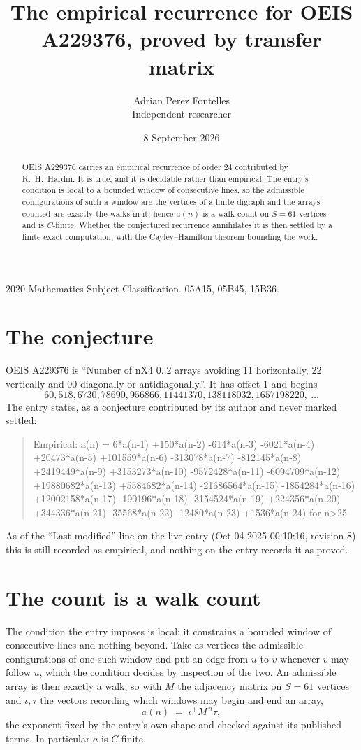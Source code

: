 \documentclass[11pt,a4paper]{article}
\title{The empirical recurrence for OEIS A229376, proved by transfer matrix}
\author{Adrian Perez Fontelles\\ \small Independent researcher}
\date{8 September 2026}
\theoremstyle{plain}
\theoremstyle{definition}
\begin{document}
\maketitle

\begin{abstract}
OEIS A229376 carries an empirical recurrence of order $24$ contributed by R.~H.~Hardin. It is
true, and it is decidable rather than empirical. The entry's condition is local to a bounded window of consecutive lines, so
the admissible configurations of such a window are the vertices of a finite digraph and the
arrays counted are exactly the walks in it; hence $a(n)$ is a walk count on $S=61$ vertices
and is $C$-finite. Whether the conjectured recurrence annihilates it is then settled by a
finite exact computation, with the Cayley--Hamilton theorem bounding the work.
\end{abstract}

\noindent\small 2020 Mathematics Subject Classification. 05A15, 05B45, 15B36.\normalsize

\section{The conjecture}

OEIS A229376 is ``Number of nX4 0..2 arrays avoiding 11 horizontally, 22 vertically and 00 diagonally or antidiagonally.''. It has offset $1$ and begins
\[
60, 518, 6730, 78690, 956866, 11441370, 138118032, 1657198220,\ \dots
\]
The entry states, as a conjecture contributed by its author and never marked settled:
\begin{quote}
Empirical: a(n) = 6*a(n-1) +150*a(n-2) -614*a(n-3) -6021*a(n-4) +20473*a(n-5) +101559*a(n-6) -313078*a(n-7) -812145*a(n-8) +2419449*a(n-9) +3153273*a(n-10) -9572428*a(n-11) -6094709*a(n-12) +19880682*a(n-13) +5584682*a(n-14) -21686564*a(n-15) -1854284*a(n-16) +12002158*a(n-17) -190196*a(n-18) -3154524*a(n-19) +224356*a(n-20) +344336*a(n-21) -35568*a(n-22) -12480*a(n-23) +1536*a(n-24) for n>25
\end{quote}
As of the ``Last modified'' line on the live entry (Oct 04 2025 00:10:16, revision 8) this is still
recorded as empirical, and nothing on the entry records it as proved.

\section{The count is a walk count}

The condition the entry imposes is local: it constrains a bounded window of consecutive lines and nothing beyond. Take as
vertices the admissible configurations of one such window and put an edge from $u$ to $v$
whenever $v$ may follow $u$, which the condition decides by inspection of the two. An
admissible array is then exactly a walk, so with $M$ the adjacency matrix on $S=61$ vertices
and $\iota,\tau$ the vectors recording which windows may begin and end an array,
\[
a(n)\;=\;\iota^{\!\top}M^{\,n}\tau ,
\]
the exponent fixed by the entry's own shape and checked against its published terms. In
particular $a$ is $C$-finite.
\end{document}

